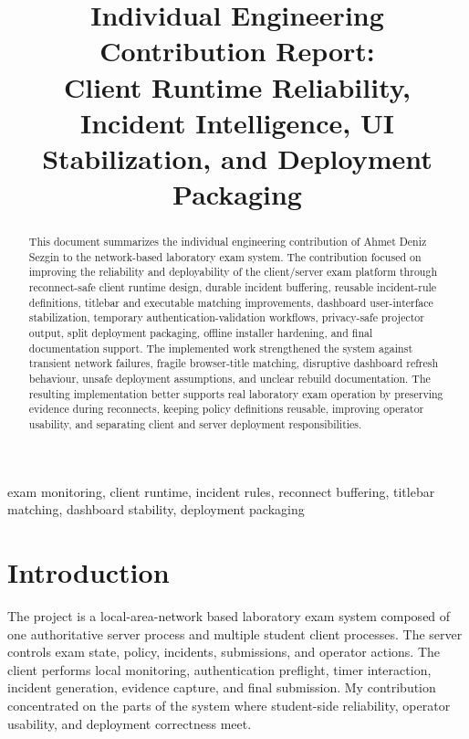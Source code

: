 \documentclass[conference]{IEEEtran}
\begin{document}
\title{Individual Engineering Contribution Report:\\
Client Runtime Reliability, Incident Intelligence, UI Stabilization, and Deployment Packaging}

\author{
}

\maketitle

\begin{abstract}
This document summarizes the individual engineering contribution of Ahmet Deniz Sezgin to the network-based laboratory exam system. The contribution focused on improving the reliability and deployability of the client/server exam platform through reconnect-safe client runtime design, durable incident buffering, reusable incident-rule definitions, titlebar and executable matching improvements, dashboard user-interface stabilization, temporary authentication-validation workflows, privacy-safe projector output, split deployment packaging, offline installer hardening, and final documentation support. The implemented work strengthened the system against transient network failures, fragile browser-title matching, disruptive dashboard refresh behaviour, unsafe deployment assumptions, and unclear rebuild documentation. The resulting implementation better supports real laboratory exam operation by preserving evidence during reconnects, keeping policy definitions reusable, improving operator usability, and separating client and server deployment responsibilities.
\end{abstract}

\begin{IEEEkeywords}
exam monitoring, client runtime, incident rules, reconnect buffering, titlebar matching, dashboard stability, deployment packaging
\end{IEEEkeywords}

\section{Introduction}

The project is a local-area-network based laboratory exam system composed of one authoritative server process and multiple student client processes. The server controls exam state, policy, incidents, submissions, and operator actions. The client performs local monitoring, authentication preflight, timer interaction, incident generation, evidence capture, and final submission. My contribution concentrated on the parts of the system where student-side reliability, operator usability, and deployment correctness meet.
\end{document}
